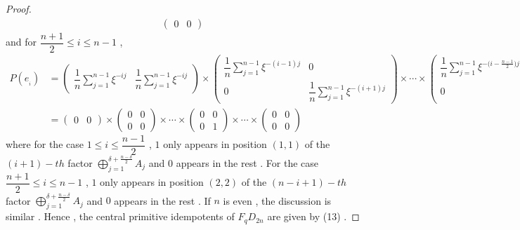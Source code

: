 \documentclass{article}
\begin{document}
\begin{proof}
\begin{align*}
\begin{pmatrix}
            0&0
        \end{pmatrix}
    \end{align*}
    and for $\dfrac{n+1}{2}\leq i\leq n-1$ ,
    \begin{align*}
        P(e_{_i})&=\begin{pmatrix}
        \dfrac{1}{n}\sum\limits_{j=1}^{n-1}\xi^{\scriptscriptstyle-ij}&\dfrac{1}{n}\sum\limits_{j=1}^{n-1}\xi^{\scriptscriptstyle-ij}
    \end{pmatrix}
    \times
        \begin{pmatrix}
            \dfrac{1}{n}\sum\limits_{j=1}^{n-1}\xi^{\scriptscriptstyle -(i-1)j}&0\\
            0&\dfrac{1}{n}\sum\limits_{j=1}^{n-1}\xi^{\scriptscriptstyle-(i+1)j}
        \end{pmatrix}
        \times\cdots\times
        \begin{pmatrix}
            \dfrac{1}{n}\sum\limits_{j=1}^{n-1}\xi^{-({\scriptscriptstyle i-\frac{n-1}{2})j}}&0\\
            0&\dfrac{1}{n}\sum\limits_{j=1}^{n-1}\xi^{-({\scriptscriptstyle i+\frac{n-1}{2})j}}
        \end{pmatrix}\\
        &=\begin{pmatrix}
          0&0
        \end{pmatrix}
        \times
        \begin{pmatrix}
            0&0\\
            0&0
        \end{pmatrix}
        \times\cdots\times
        \begin{pmatrix}
            0&0\\
            0&1
        \end{pmatrix}
        \times\cdots\times
        \begin{pmatrix}
            0&0\\
            0&0
        \end{pmatrix}
    \end{align*}
    where for the case $1\leq i\leq\dfrac{n-1}{2}$ , $1$ only appears in position $(1,1)$ of the $(i+1)-th$ factor $\mathop{\bigoplus}\limits_{j=1}^{\delta+\frac{n-\delta}{2}}A_j$ and $0$ appears in the rest . For the case $\dfrac{n+1}{2}\leq i\leq n-1$ , $1$ only appears in position $(2,2)$ of the $(n-i+1)-th$ factor $\mathop{\bigoplus}\limits_{j=1}^{\delta+\frac{n-\delta}{2}}A_j$ and $0$ appears in the rest . If $n$ is even , the discussion is similar .
    Hence , the central primitive idempotents of $F_qD_{2n}$ are given by (13) .
\end{proof}
\end{document}
